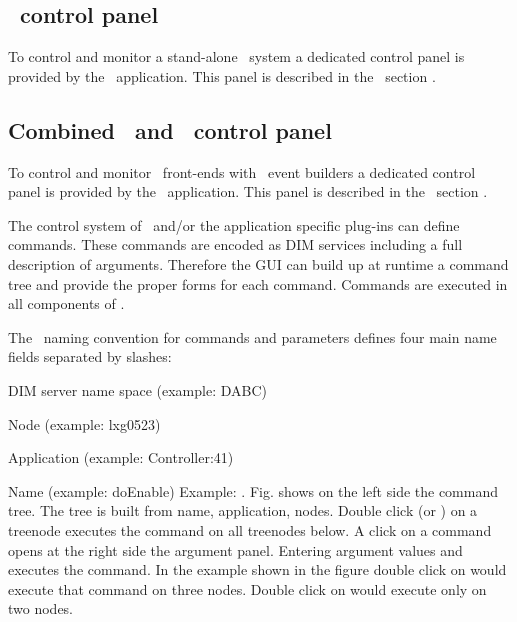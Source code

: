 \subsection[MBS control panel]{\mbs\ control panel}
To control and monitor a stand-alone \mbs\ system a dedicated control
panel is provided by the \mbs\ application.
This panel is described in the \mbs\ section .

\subsection[Combined DABC and MBS control panel]{Combined \dabc\ and \mbs\ control panel}
To control and monitor \mbs\ front-ends with \dabc\ event builders a dedicated control
panel is provided by the \mbs\ application.
This panel is described in the \mbs\ section .

The control system of \dabc\ and/or the application specific plug-ins
can define commands. These commands are encoded as DIM services
including a full description of arguments. Therefore the GUI
can build up at runtime a command tree and provide the proper forms for
each command. Commands are executed in all components of \dabc.

The \dabc\ naming convention for commands and parameters defines four main name fields
separated by slashes:
\bnum
\item DIM server name space (example: DABC)
\item Node (example: lxg0523)
\item Application (example: Controller:41)
\item Name (example: doEnable)
\enum 
Example: .
Fig.  shows
on the left side the command tree. The tree is built
from name, application, nodes. Double click (or ) on a treenode
executes the command on all treenodes below.
A click on a command opens at the right side the argument panel.
Entering argument values and  executes the command.
In the example shown in the figure double click on 
would execute that command on three nodes.
Double click on  would execute only on two nodes. 


